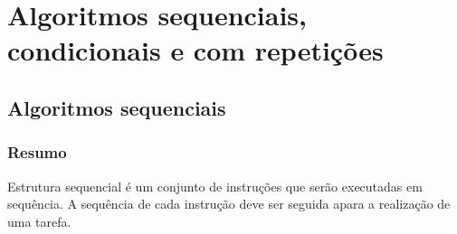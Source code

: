 
\part[Algoritmos sequenciais, condicionais e com repetições]
{Algoritmos sequenciais, condicionais e com repetições}


\chapter[Algoritmos sequenciais]
{Algoritmos sequenciais}



\section{Resumo}

Estrutura sequencial é um conjunto de instruções que serão executadas em sequência. A sequência de cada instrução deve ser seguida apara a realização de uma tarefa.


%
%








